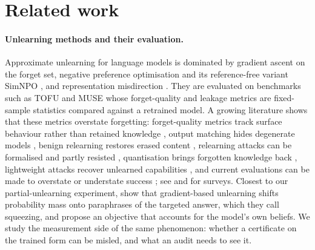 \section{Related work}\label{sec:related}

\paragraph{Unlearning methods and their evaluation.} Approximate unlearning for language
models is dominated by gradient ascent on the forget set, negative preference
optimisation \citep{zhang2024npo} and its reference-free variant SimNPO
\citep{fan2025simnpo}, and representation misdirection \citep{li2024wmdp}. They are
evaluated on benchmarks such as TOFU \citep{maini2024tofu} and MUSE \citep{shi2024muse}
whose forget-quality and leakage metrics are fixed-sample statistics compared against a
retrained model. A growing literature shows that these metrics overstate forgetting:
forget-quality metrics track surface behaviour rather than retained knowledge
\citep{wang2025towards}, output matching hides degenerate models \citep{yuan2025closer},
benign relearning restores erased content \citep{hu2025jogging}, relearning attacks can be
formalised and partly resisted \citep{fan2025relearning}, quantisation brings forgotten
knowledge back \citep{zhang2025quantization}, lightweight attacks recover unlearned
capabilities \citep{lucki2024adversarial}, and current evaluations can be made to
overstate or understate success \citep{feng2025existing}; see
\citet{liu2025rethinking} and \citet{xue2026survey} for surveys. Closest to our partial-unlearning experiment, \citet{li2026beliefs}
show that gradient-based unlearning shifts probability mass onto paraphrases of the
targeted answer, which they call squeezing, and propose an objective that accounts for
the model's own beliefs. We study the measurement side of the same phenomenon: whether a
certificate on the trained form can be misled, and what an audit needs to see it.

